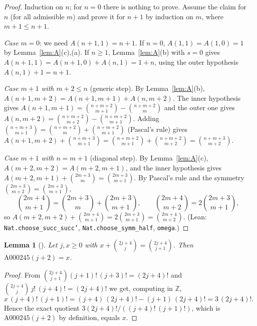 \documentclass[11pt]{amsart}
\theoremstyle{plain}
\newtheorem{lemma}[theorem]{Lemma}
\theoremstyle{definition}
\begin{document}
\begin{proof}
Induction on $n$; for $n=0$ there is nothing to prove. Assume the claim for $n$ (for all admissible $m$) and prove it for $n+1$ by induction on $m$, where $m+1\le n+1$.

\emph{Case $m=0$}: we need $A(n+1,1)=n+1$. If $n=0$, $A(1,1)=A(1,0)=1$ by Lemma~\ref{lem:A}(c),(a). If $n\ge1$, Lemma~\ref{lem:A}(b) with $s=0$ gives $A(n+1,1)=A(n+1,0)+A(n,1)=1+n$, using the outer hypothesis $A(n,1)+1=n+1$.

\emph{Case $m+1$ with $m+2\le n$} (generic step). By Lemma~\ref{lem:A}(b), $A(n+1,m+2)=A(n+1,m+1)+A(n,m+2)$. The inner hypothesis gives $A(n+1,m+1)=\binom{n+m+2}{m+1}-\binom{n+m+2}{m}$ and the outer one gives $A(n,m+2)=\binom{n+m+2}{m+2}-\binom{n+m+2}{m+1}$. Adding $\binom{n+m+3}{m+1}=\binom{n+m+2}{m}+\binom{n+m+2}{m+1}$ (Pascal's rule) gives $A(n+1,m+2)+\binom{n+m+3}{m+1}=\binom{n+m+2}{m+1}+\binom{n+m+2}{m+2}=\binom{n+m+3}{m+2}$.

\emph{Case $m+1$ with $n=m+1$} (diagonal step). By Lemma~\ref{lem:A}(c), $A(m+2,m+2)=A(m+2,m+1)$, and the inner hypothesis gives $A(m+2,m+1)+\binom{2m+3}{m}=\binom{2m+3}{m+1}$. By Pascal's rule and the symmetry $\binom{2m+3}{m+2}=\binom{2m+3}{m+1}$,
\[
  \binom{2m+4}{m+1}=\binom{2m+3}{m}+\binom{2m+3}{m+1},\qquad \binom{2m+4}{m+2}=2\binom{2m+3}{m+1},
\]
so $A(m+2,m+2)+\binom{2m+4}{m+1}=2\binom{2m+3}{m+1}=\binom{2m+4}{m+2}$. (Lean: \texttt{Nat.choose\_succ\_succ'}, \texttt{Nat.choose\_symm\_half}, \texttt{omega}.)
\end{proof}

\begin{lemma}[]\label{lem:fact}
Let $j,x\ge0$ with $x+\binom{2j+4}{j}=\binom{2j+4}{j+1}$. Then $\mathrm{A000245}(j+2)=x$.
\end{lemma}

\begin{proof}
From $\binom{2j+4}{j+1}(j+1)!\,(j+3)!=(2j+4)!$ and $\binom{2j+4}{j}\,j!\,(j+4)!=(2j+4)!$ we get, computing in $\mathbb Z$,
\[
  x\,(j+4)!\,(j+1)!=(j+4)\,(2j+4)!-(j+1)\,(2j+4)!=3\,(2j+4)!.
\]
Hence the exact quotient $3(2j+4)!/((j+4)!\,(j+1)!)$, which is $\mathrm{A000245}(j+2)$ by definition, equals $x$.
\end{proof}
\end{document}
